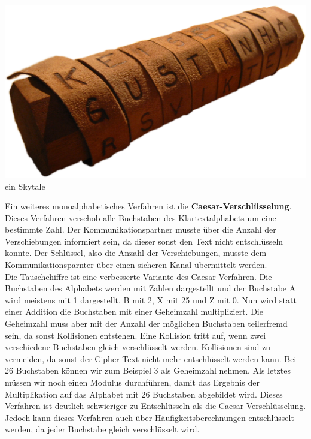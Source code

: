\documentclass[12pt,a4paper]{report}
\begin{document}
\begin{onehalfspace}
\begin{center}
\includegraphics[scale=0.3]{img/krypto_skytale.png}\\
ein Skytale \cite{wiki10}
\end{center}

Ein weiteres monoalphabetisches Verfahren ist die \textbf{Caesar-Verschlüsselung}. Dieses Verfahren verschob alle Buchstaben des Klartextalphabets um eine bestimmte Zahl. Der Kommunikationspartner musste über die Anzahl der Verschiebungen informiert sein, da dieser sonst den Text nicht entschlüsseln konnte. Der Schlüssel, also die Anzahl der Verschiebungen, musste dem Kommunikationsparnter über einen sicheren Kanal übermittelt werden. \cite{krypto01}\\

Die Tauschchiffre ist eine verbesserte Variante des Caesar-Verfahren. Die Buchstaben des Alphabets werden mit Zahlen dargestellt und der Buchstabe A wird meistens mit 1 dargestellt, B mit 2, X mit 25 und Z mit 0. Nun wird statt einer Addition die Buchstaben mit einer Geheimzahl multipliziert. Die Geheimzahl muss aber mit der Anzahl der möglichen Buchstaben teilerfremd sein, da sonst Kollisionen entstehen. Eine Kollision tritt auf, wenn zwei verschiedene Buchstaben gleich verschlüsselt werden. Kollisionen sind zu vermeiden, da sonst der Cipher-Text nicht mehr entschlüsselt werden kann. Bei 26 Buchstaben können wir zum Beispiel 3 als Geheimzahl nehmen. Als letztes müssen wir noch einen Modulus durchführen, damit das Ergebnis der Multiplikation auf das Alphabet mit 26 Buchstaben abgebildet wird. Dieses Verfahren ist deutlich schwieriger zu Entschlüsseln als die Caesar-Verschlüsselung. Jedoch kann dieses Verfahren auch über Häufigkeitsberechnungen entschlüsselt werden, da jeder Buchstabe gleich verschlüsselt wird.  \cite{krypto01}\\


\end{onehalfspace}
\end{document}
